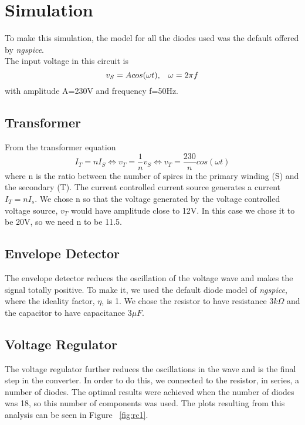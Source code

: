\section{Simulation}
\label{sec: sim}
To make this simulation, the model for all the diodes used was the default offered by \textit{ngspice}. \\
The input voltage in this circuit is 
\begin{equation}\label{eq: vs}
v_S=Acos(\omega t),\hspace{3mm} \omega=2\pi f
\end{equation}
with amplitude A=230V and frequency f=50Hz.
\subsection{Transformer}
From the transformer equation 
\begin{equation}
  I_T=nI_S\Leftrightarrow v_T=\frac{1}{n}v_S \Leftrightarrow v_T=\frac{230}{n}cos(\omega t)
\end{equation}
where n is the ratio between the number of spires in the primary winding (S) and the secondary (T).
The current controlled current source generates a current $I_T=nI_s$. We chose n so that the voltage generated by the voltage controlled voltage source, $v_T$ would have amplitude close to 12V. In this case we chose it to be 20V, so we need n to be 11.5.\\
\subsection{Envelope Detector}
The envelope detector reduces the oscillation of the voltage wave and makes the signal totally positive.  To make it, we used the default diode model of \textit{ngspice}, where the ideality factor, $\eta$, is 1. We chose the resistor to have resistance $3k\Omega$ and the capacitor to have capacitance $3\mu F$.\\
\subsection{Voltage Regulator}
The voltage regulator further reduces the oscillations in the wave and is the final step in the converter. In order to do this, we connected to the resistor, in series, a number of diodes. The optimal results were achieved when the number of diodes was 18, so this number of components was used. 
The plots resulting from this analysis can be seen in Figure ~\ref{fig:rc1}. 
